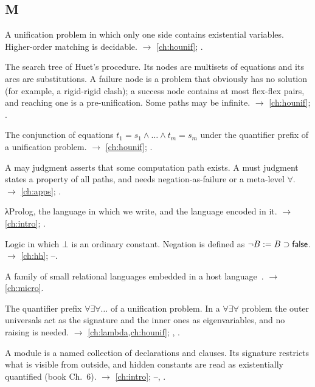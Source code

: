 \subsection*{M}
\begin{glossarylist}
\item[Matching] A unification problem in which only one side contains existential variables. Higher-order matching
  is decidable. $\rightarrow$ \cref{ch:hounif}; .
\item[Matching tree] The search tree of Huet's procedure. Its nodes are multisets of equations and its arcs are
  substitutions. A failure node is a problem that obviously has no solution (for example, a rigid-rigid clash); a success node
  contains at most flex-flex pairs, and reaching one is a pre-unification. Some paths may be infinite.
  $\rightarrow$ \cref{ch:hounif}; .
\item[Matrix] The conjunction of equations $t_1=s_1\wedge\dots\wedge t_m=s_m$ under the quantifier prefix of a
  unification problem. $\rightarrow$ \cref{ch:hounif}; .
\item[May judgment, must judgment] A may judgment asserts that some computation path exists. A must judgment states
  a property of all paths, and needs negation-as-failure or a meta-level $\forall$.
  $\rightarrow$ \cref{ch:apps}; .
\item[Metalanguage, object language] λProlog, the language in which we write, and the language encoded in it.
  $\rightarrow$ \cref{ch:intro}; .
\item[Minimal logic] Logic in which $\bot$ is an ordinary constant. Negation is defined as
  $\neg B := B\supset\mathsf{false}$. $\rightarrow$ \cref{ch:hh}; --.
\item[miniKanren] A family of small relational languages embedded in a host language~\cite{FriedmanEtAl2018,Byrd2009}.
  $\rightarrow$ \cref{ch:micro}.
\item[Mixed prefix] The quantifier prefix $\forall\exists\forall\dots$ of a unification problem. In a
  $\forall\exists\forall$ problem the outer universals act as the signature and the inner ones as eigenvariables,
  and no raising is needed. $\rightarrow$ \cref{ch:lambda,ch:hounif}; , .
\item[Module, signature (Teyjus)] A module is a named collection of declarations and clauses. Its signature
  restricts what is visible from outside, and hidden constants are read as existentially quantified (book
  Ch.~6). $\rightarrow$ \cref{ch:intro}; --, .

\end{glossarylist}
